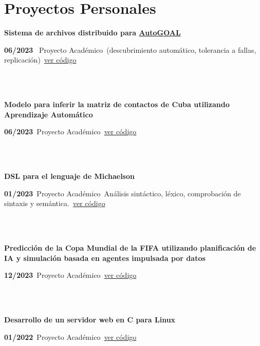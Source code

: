 \documentclass{article}
\begin{document}
\section*{Proyectos Personales}
\begin{minipage}{0.8\textwidth}
\parbox{0.8\linewidth}{\textbf{Sistema de archivos distribuido para \href{https://autogoal.github.io/}{AutoGOAL}}}\hfill \textbf{06/2023} \
Proyecto Académico\
(descubrimiento automático, tolerancia a fallas, replicación)\
\href{https://github.com/geeksLabTech/kade-drive}{ver código}\
\end{minipage} \hfill {}\\\\
\begin{minipage}{0.8\textwidth}
\parbox{0.8\linewidth}{\textbf{Modelo para inferir la matriz de contactos de Cuba utilizando Aprendizaje Automático}} \hfill \textbf{06/2023}\
Proyecto Académico\
\href{https://github.com/geeksLabTech/epidemic-classification-ml-project}{ver código}\
\end{minipage} \hfill {}\\\\
\begin{minipage}{0.8\textwidth}
\parbox{0.8\linewidth}{\textbf{DSL para el lenguaje de Michaelson}} \hfill \textbf{01/2023}\
Proyecto Académico\
Análisis sintáctico, léxico, comprobación de sintaxis y semántica.\
\href{https://github.com/geeksLabTech/compilation-dsl-project}{ver código}\
\end{minipage} \hfill {}\\\\
\begin{minipage}{0.8\textwidth}
\parbox{0.8\linewidth}{\textbf{Predicción de la Copa Mundial de la FIFA utilizando planificación de IA y simulación basada en agentes impulsada por datos}} \hfill \textbf{12/2023}\
Proyecto Académico\
\href{https://github.com/geeksLabTech/FIFA_World_Cup_2022}{ver código}\
\end{minipage} \hfill {}\\\\
\begin{minipage}{0.8\textwidth}
\parbox{0.8\linewidth}{\textbf{Desarrollo de un servidor web en C para Linux}} \hfill \textbf{01/2022}\
Proyecto Académico\
\href{https://github.com/geeksLabTech/web_server}{ver código}\
\end{minipage} \hfill {}\\\\
\end{document}
